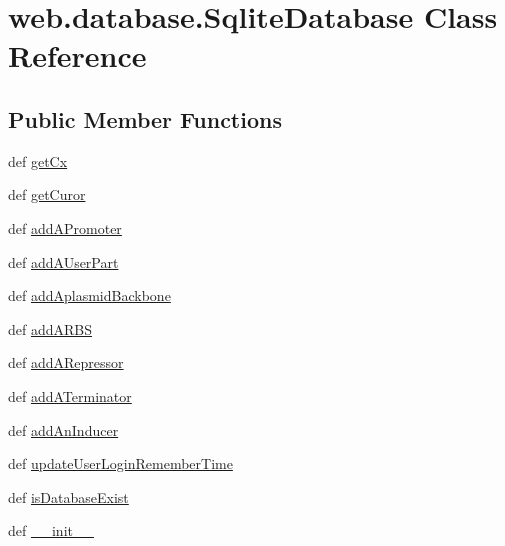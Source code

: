 \hypertarget{classweb_1_1database_1_1_sqlite_database}{\section{web.\-database.\-Sqlite\-Database Class Reference}
\label{classweb_1_1database_1_1_sqlite_database}
}
\subsection*{Public Member Functions}
\begin{DoxyCompactItemize}
\item 
def \hyperlink{classweb_1_1database_1_1_sqlite_database_ad2a7f19f35678292548e0393cd825183}{get\-Cx}
\item 
def \hyperlink{classweb_1_1database_1_1_sqlite_database_ab72f9cbafeb06d8cff21a475ccdbebe3}{get\-Curor}
\item 
def \hyperlink{classweb_1_1database_1_1_sqlite_database_a4093cd2060b23664f975837e3e2c4254}{add\-A\-Promoter}
\item 
def \hyperlink{classweb_1_1database_1_1_sqlite_database_a2a7d9ad306b7f3b4b565ac475ae5b1f4}{add\-A\-User\-Part}
\item 
def \hyperlink{classweb_1_1database_1_1_sqlite_database_ada2f619fce15f45b88b2d6731f76e01a}{add\-Aplasmid\-Backbone}
\item 
def \hyperlink{classweb_1_1database_1_1_sqlite_database_a142721418384bd5c28a3a297e26b3982}{add\-A\-R\-B\-S}
\item 
def \hyperlink{classweb_1_1database_1_1_sqlite_database_ac5916b100f59267d3b82b091049dd339}{add\-A\-Repressor}
\item 
def \hyperlink{classweb_1_1database_1_1_sqlite_database_a6d3c408fa37da3818ff89638459ef173}{add\-A\-Terminator}
\item 
def \hyperlink{classweb_1_1database_1_1_sqlite_database_a0862c033c1cc6a19ec4434f5277aa0fd}{add\-An\-Inducer}
\item 
def \hyperlink{classweb_1_1database_1_1_sqlite_database_af2e6bb04f7b3dda731675513008a8bbd}{update\-User\-Login\-Remember\-Time}
\item 
def \hyperlink{classweb_1_1database_1_1_sqlite_database_a69bdd16ba96ab16a65004e593ae80428}{is\-Database\-Exist}
\item 
def \hyperlink{classweb_1_1database_1_1_sqlite_database_afcef92fc58cf542486b4772895a22aa3}{\-\_\-\-\_\-init\-\_\-\-\_\-}
\item 

\end{DoxyCompactItemize}
